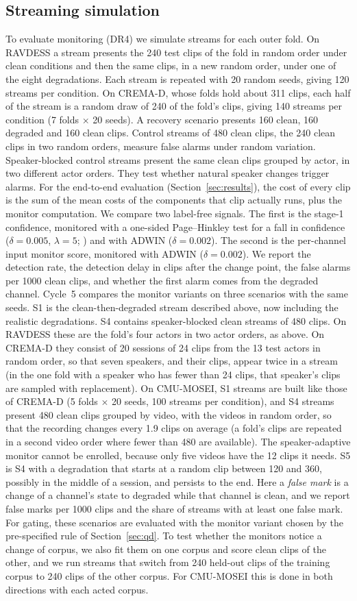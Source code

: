 \subsection{Streaming simulation}

To evaluate monitoring (DR4) we simulate streams for each outer fold. On RAVDESS a stream presents the 240 test clips of the fold in random order under clean conditions and then the same clips, in a new random order, under one of the eight degradations. Each stream is repeated with 20 random seeds, giving 120 streams per condition. On CREMA-D, whose folds hold about 311 clips, each half of the stream is a random draw of 240 of the fold's clips, giving 140 streams per condition (7 folds $\times$ 20 seeds). A recovery scenario presents 160 clean, 160 degraded and 160 clean clips. Control streams of 480 clean clips, the 240 clean clips in two random orders, measure false alarms under random variation. Speaker-blocked control streams present the same clean clips grouped by actor, in two different actor orders. They test whether natural speaker changes trigger alarms. For the end-to-end evaluation (Section~\ref{sec:results}), the cost of every clip is the sum of the mean costs of the components that clip actually runs, plus the monitor computation. We compare two label-free signals. The first is the stage-1 confidence, monitored with a one-sided Page--Hinkley test for a fall in confidence ($\delta=0.005$, $\lambda=5$; \citealp{page1954}) and with ADWIN ($\delta=0.002$). The second is the per-channel input monitor score, monitored with ADWIN ($\delta=0.002$). We report the detection rate, the detection delay in clips after the change point, the false alarms per 1000 clean clips, and whether the first alarm comes from the degraded channel. Cycle~5 compares the monitor variants on three scenarios with the same seeds. S1 is the clean-then-degraded stream described above, now including the realistic degradations. S4 contains speaker-blocked clean streams of 480 clips. On RAVDESS these are the fold's four actors in two actor orders, as above. On CREMA-D they consist of 20 sessions of 24 clips from the 13 test actors in random order, so that seven speakers, and their clips, appear twice in a stream (in the one fold with a speaker who has fewer than 24 clips, that speaker's clips are sampled with replacement). On CMU-MOSEI, S1 streams are built like those of CREMA-D (5 folds $\times$ 20 seeds, 100 streams per condition), and S4 streams present 480 clean clips grouped by video, with the videos in random order, so that the recording changes every 1.9 clips on average (a fold's clips are repeated in a second video order where fewer than 480 are available). The speaker-adaptive monitor cannot be enrolled, because only five videos have the 12 clips it needs. S5 is S4 with a degradation that starts at a random clip between 120 and 360, possibly in the middle of a session, and persists to the end. Here a \emph{false mark} is a change of a channel's state to degraded while that channel is clean, and we report false marks per 1000 clips and the share of streams with at least one false mark. For gating, these scenarios are evaluated with the monitor variant chosen by the pre-specified rule of Section~\ref{sec:qd}. To test whether the monitors notice a change of corpus, we also fit them on one corpus and score clean clips of the other, and we run streams that switch from 240 held-out clips of the training corpus to 240 clips of the other corpus. For CMU-MOSEI this is done in both directions with each acted corpus.
